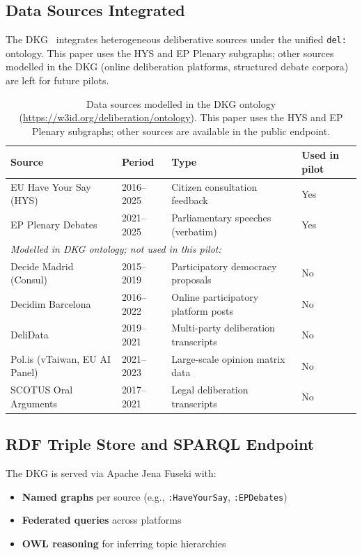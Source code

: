 \documentclass[sigconf,natbib]{acmart}
\begin{document}
\subsection{Data Sources Integrated}

The DKG~\cite{Vagnoni2026} integrates heterogeneous deliberative sources under the unified \texttt{del:} ontology.
This paper uses the HYS and EP Plenary subgraphs; other sources modelled in the DKG (online deliberation platforms, structured debate corpora) are left for future pilots.

\begin{table}[h]
\centering
\small
\begin{tabular}{llll}
\toprule
\textbf{Source} & \textbf{Period} & \textbf{Type} & \textbf{Used in pilot} \\
\midrule
EU Have Your Say (HYS)         & 2016--2025 & Citizen consultation feedback        & Yes \\
EP Plenary Debates             & 2021--2025 & Parliamentary speeches (verbatim)    & Yes \\
\midrule
\multicolumn{4}{l}{\textit{Modelled in DKG ontology; not used in this pilot:}} \\
Decide Madrid (Consul)         & 2015--2019 & Participatory democracy proposals    & No \\
Decidim Barcelona              & 2016--2022 & Online participatory platform posts  & No \\
DeliData                       & 2019--2021 & Multi-party deliberation transcripts & No \\
Pol.is (vTaiwan, EU AI Panel)  & 2021--2023 & Large-scale opinion matrix data      & No \\
SCOTUS Oral Arguments          & 2017--2021 & Legal deliberation transcripts       & No \\
\bottomrule
\end{tabular}
\caption{Data sources modelled in the DKG ontology (\url{https://w3id.org/deliberation/ontology}).
This paper uses the HYS and EP Plenary subgraphs; other sources are available in the public endpoint.}
\label{tab:sources}
\end{table}

\subsection{RDF Triple Store and SPARQL Endpoint}
The DKG is served via Apache Jena Fuseki with:
\begin{itemize}
  \item \textbf{Named graphs} per source (e.g., \texttt{:HaveYourSay}, \texttt{:EPDebates})
  \item \textbf{Federated queries} across platforms
  \item \textbf{OWL reasoning} for inferring topic hierarchies
\end{itemize}
\end{document}
